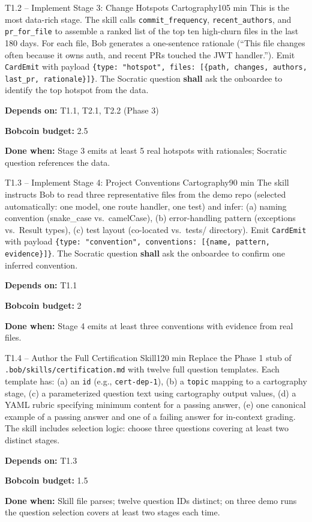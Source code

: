 \documentclass[11pt,letterpaper]{article}
\newcommand{\acceptance}[1]{\par\smallskip\textcolor{ibmgreen}{\textbf{Done when:}} #1}
\newcommand{\depends}[1]{\par\smallskip\textcolor{ibmorange}{\textbf{Depends on:}} #1}
\newcommand{\bobcost}[1]{\par\smallskip\textcolor{ibmaccent}{\textbf{Bobcoin budget:}} #1}
\newcommand{\shall}{\textbf{shall}}
\begin{document}
\begin{task}{T1.2 -- Implement Stage 3: Change Hotspots Cartography}{105 min}
This is the most data-rich stage. The skill calls \texttt{commit\_frequency}, \texttt{recent\_authors}, and \texttt{pr\_for\_file} to assemble a ranked list of the top ten high-churn files in the last 180 days. For each file, Bob generates a one-sentence rationale (``This file changes often because it owns auth, and recent PRs touched the JWT handler.''). Emit \texttt{CardEmit} with payload \texttt{\{type: "hotspot", files: [\{path, changes, authors, last\_pr, rationale\}]\}}. The Socratic question \shall{} ask the onboardee to identify the top hotspot from the data.
\depends{T1.1, T2.1, T2.2 (Phase 3)}
\bobcost{2.5}
\acceptance{Stage 3 emits at least 5 real hotspots with rationales; Socratic question references the data.}
\end{task}

\begin{task}{T1.3 -- Implement Stage 4: Project Conventions Cartography}{90 min}
The skill instructs Bob to read three representative files from the demo repo (selected automatically: one model, one route handler, one test) and infer: (a) naming convention (snake\_case vs.~camelCase), (b) error-handling pattern (exceptions vs.~Result types), (c) test layout (co-located vs.~tests/ directory). Emit \texttt{CardEmit} with payload \texttt{\{type: "convention", conventions: [\{name, pattern, evidence\}]\}}. The Socratic question \shall{} ask the onboardee to confirm one inferred convention.
\depends{T1.1}
\bobcost{2}
\acceptance{Stage 4 emits at least three conventions with evidence from real files.}
\end{task}

\begin{task}{T1.4 -- Author the Full Certification Skill}{120 min}
Replace the Phase 1 stub of \texttt{.bob/skills/certification.md} with twelve full question templates. Each template has: (a) an \texttt{id} (e.g., \texttt{cert-dep-1}), (b) a \texttt{topic} mapping to a cartography stage, (c) a parameterized question text using cartography output values, (d) a YAML rubric specifying minimum content for a passing answer, (e) one canonical example of a passing answer and one of a failing answer for in-context grading. The skill includes selection logic: choose three questions covering at least two distinct stages.
\depends{T1.3}
\bobcost{1.5}
\acceptance{Skill file parses; twelve question IDs distinct; on three demo runs the question selection covers at least two stages each time.}
\end{task}
\end{document}
